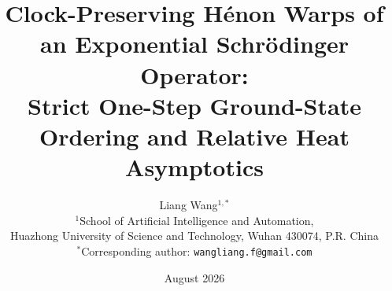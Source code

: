 \documentclass[11pt]{article}
\title{Clock-Preserving H\'enon Warps
of an Exponential Schr\"odinger Operator:\\
Strict One-Step Ground-State Ordering and Relative Heat Asymptotics}
\author{Liang Wang$^{1,*}$\\[2mm]
\small $^1$School of Artificial Intelligence and Automation,\\[-1mm]
\small Huazhong University of Science and Technology, Wuhan 430074, P.R. China\\[-1mm]
\small $^*$Corresponding author: \texttt{wangliang.f@gmail.com}}
\date{August 2026}
\begin{document}
\maketitle



\tableofcontents








\FloatBarrier






\end{document}
